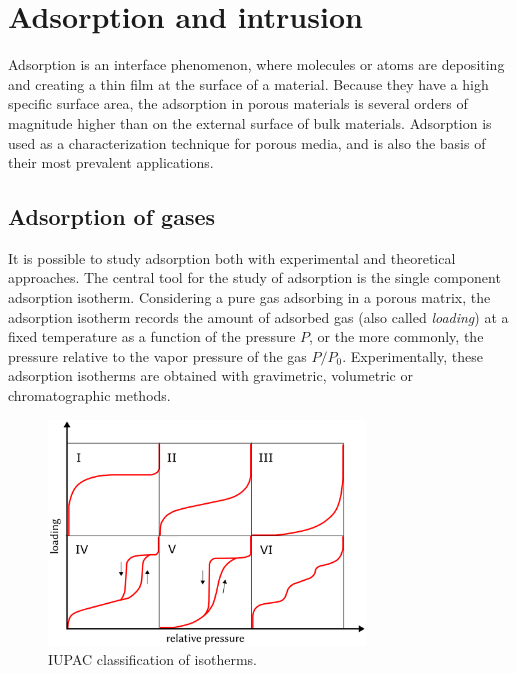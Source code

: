 \documentclass[thesis]{subfiles}
\begin{document}
\newpage
\section{Adsorption and intrusion}

Adsorption is an interface phenomenon, where molecules or atoms are depositing
and creating a thin film at the surface of a material. Because they have a high
specific surface area, the adsorption in porous materials is several orders of
magnitude higher than on the external surface of bulk materials. Adsorption is
used as a characterization technique for porous media, and is also the basis of
their most prevalent applications.

\subsection{Adsorption of gases}

It is possible to study adsorption both with experimental and theoretical
approaches. The central tool for the study of adsorption is the single component
adsorption isotherm. Considering a pure gas adsorbing in a porous matrix, the
adsorption isotherm records the amount of adsorbed gas (also called
\emph{loading}) at a fixed temperature as a function of the pressure $P$, or the
more commonly, the pressure relative to the vapor pressure of the gas $P/P_0$.
Experimentally, these adsorption isotherms are obtained with gravimetric,
volumetric or chromatographic methods\cite{Ruthven1984, Yang1987}.

\begin{figure}[htb]
    \centering
    \includegraphics[width=0.75\textwidth]{figures/images/iupac-isotherms}
    \caption{IUPAC classification of isotherms.}
    \label{fig:iupac-isotherms}
\end{figure}
\end{document}
